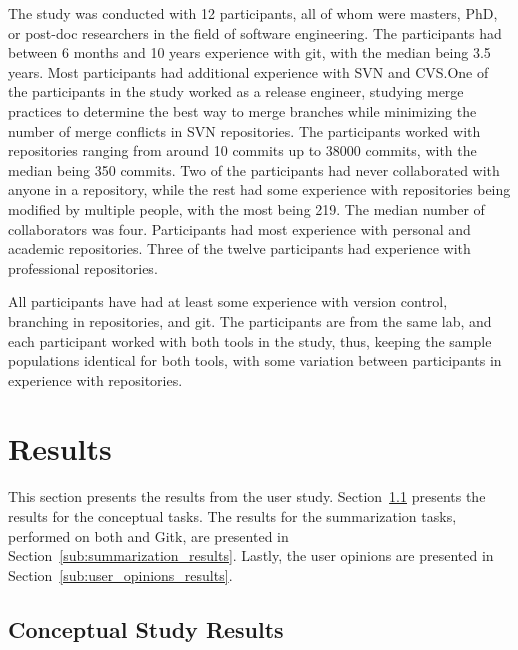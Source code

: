 The study was conducted with 12 participants, all of whom were masters,
PhD, or post-doc researchers in the field of software engineering. The
participants had between 6 months and 10 years experience with git, with
the median being 3.5 years. Most participants had additional experience
with SVN and CVS.\@ One of the participants in the study worked as a
release engineer, studying merge practices to determine the best way to
merge branches while minimizing the number of merge conflicts in SVN
repositories. The participants worked with repositories ranging from
around 10 commits up to 38000 commits, with the median being 350
commits. Two of the participants had never collaborated with anyone in a
repository, while the rest had some experience with repositories being
modified by multiple people, with the most being 219. The median number
of collaborators was four. Participants had most experience with
personal and academic repositories. Three of the twelve participants had
experience with professional repositories.

All participants have had at least some experience with version control,
branching in repositories, and git. The participants are from the same
lab, and each participant worked with both tools in the study, thus,
keeping the sample populations identical for both tools, with some
variation between participants in experience with repositories.

\section{Results}
\label{sec:results}

This section presents the results from the user study.
Section~\ref{sub:conceptual_results} presents the results for the
conceptual tasks.
The results for the summarization tasks, performed on both \tool{} and
Gitk, are presented in Section~\ref{sub:summarization_results}.
Lastly, the user opinions are presented in
Section~\ref{sub:user_opinions_results}.

\subsection{Conceptual Study Results}
\label{sub:conceptual_results}


